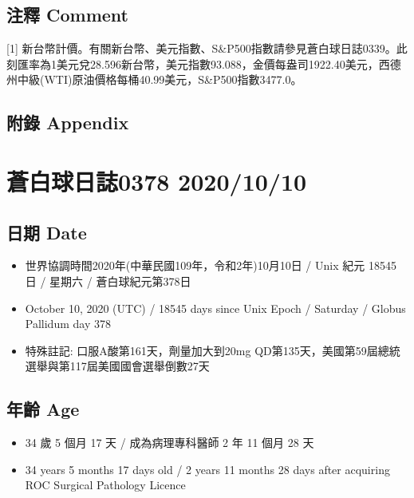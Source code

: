 \documentclass[
]{article}
\providecommand{\tightlist}{%
  \setlength{\itemsep}{0pt}\setlength{\parskip}{0pt}}
\begin{document}
\hypertarget{ux6ce8ux91cb-comment-8}{%
\subsection{注釋 Comment}\label{ux6ce8ux91cb-comment-8}}

{[}1{]}
新台幣計價。有關新台幣、美元指數、S\&P500指數請參見蒼白球日誌0339。此刻匯率為1美元兌28.596新台幣，美元指數93.088，金價每盎司1922.40美元，西德州中級(WTI)原油價格每桶40.99美元，S\&P500指數3477.0。

\hypertarget{ux9644ux9304-appendix-8}{%
\subsection{附錄 Appendix}\label{ux9644ux9304-appendix-8}}

\hypertarget{ux84bcux767dux7403ux65e5ux8a8c0378-20201010}{%
\section{蒼白球日誌0378
2020/10/10}\label{ux84bcux767dux7403ux65e5ux8a8c0378-20201010}}

\hypertarget{ux65e5ux671f-date-9}{%
\subsection{日期 Date}\label{ux65e5ux671f-date-9}}

\begin{itemize}
\tightlist
\item
  世界協調時間2020年(中華民國109年，令和2年)10月10日 / Unix 紀元 18545
  日 / 星期六 / 蒼白球紀元第378日
\item
  October 10, 2020 (UTC) / 18545 days since Unix Epoch / Saturday /
  Globus Pallidum day 378
\item
  特殊註記: 口服A酸第161天，劑量加大到20mg
  QD第135天，美國第59屆總統選舉與第117屆美國國會選舉倒數27天
\end{itemize}

\hypertarget{ux5e74ux9f61-age-9}{%
\subsection{年齡 Age}\label{ux5e74ux9f61-age-9}}

\begin{itemize}
\tightlist
\item
  34 歲 5 個月 17 天 / 成為病理專科醫師 2 年 11 個月 28 天
\item
  34 years 5 months 17 days old / 2 years 11 months 28 days after
  acquiring ROC Surgical Pathology Licence
\end{itemize}
\end{document}

